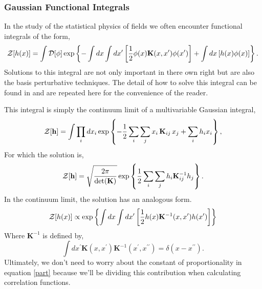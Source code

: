 \subsubsection{Gaussian Functional Integrals}

In the study of the statistical physics of fields we often encounter functional
integrals of the form,
%
\begin{equation}
    \mathcal{Z}[h(x)] = \int \mathcal{D}[\phi] \exp\left\lbrace - \int dx \int dx^\prime \left[
        \frac{1}{2}\phi(x) \mathbf{K}(x, x^\prime) \phi(x^\prime)
    \right] + \int dx \left[h(x) \phi(x)\right]\right\rbrace.  
\end{equation}
%
Solutions to this integral are not only important in there own right but are
also the basis perturbative techniques. The detail of how to solve this
integral can be found in \cite{Kardar} and are repeated here for the
convenience of the reader.

This integral is simply the continuum limit of a multivariable Gaussian
integral,
%
\begin{equation}
    \mathcal{Z}[\mathbf{h}] = \int \prod_i dx_i \exp \left\lbrace 
        - \frac{1}{2}\sum_i \sum_j x_i\, \mathbf{K}_{ij}\, x_j  
        + \sum_i h_i x_i\right\rbrace,
\end{equation}
%
For which the solution is,
%
\begin{equation}
    \mathcal{Z}[\mathbf{h}] = \sqrt{\frac{2\pi}{\det(\mathbf{K})}} 
        \exp\left\lbrace \frac{1}{2} \sum_i \sum_j 
        h_i \mathbf{K}_{ij}^{-1} h_j\right\rbrace.
\end{equation}
%
In the continuum limit, the solution has an analogous form.
%
\begin{equation}\label{part}
    \mathcal{Z}[h(x)] \propto \exp\left\lbrace \int dx \int dx^\prime 
        \left[ \frac{1}{2}h(x) \mathbf{K}^{-1}(x, x^\prime) h(x^\prime)\right]
        \right\rbrace
\end{equation}
%
Where $\mathbf{K}^{-1}$ is defined by,
%
\begin{equation}
    \int dx^\prime \mathbf{K}(x, x^\prime)\mathbf{K}^{-1}
        (x^\prime, x^{\prime\prime}) = \delta(x - x^{\prime\prime}).
\end{equation}
%
Ultimately, we don't need to worry about the constant of proportionality in
equation \ref{part} because we'll be dividing this contribution when
calculating correlation functions.


